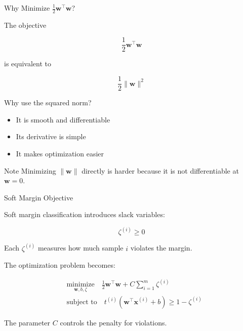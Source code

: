 \documentclass[aspectratio=169]{beamer}
\begin{document}

\begin{frame}{Why Minimize \(\frac{1}{2}\mathbf{w}^{\top}\mathbf{w}\)?}

The objective

\[
\frac{1}{2}\mathbf{w}^{\top}\mathbf{w}
\]

is equivalent to

\[
\frac{1}{2}\lVert \mathbf{w}\rVert^2
\]

\vspace{0.5em}

Why use the squared norm?

\begin{itemize}
\item It is smooth and differentiable
\item Its derivative is simple
\item It makes optimization easier
\end{itemize}

\vspace{0.5em}

\begin{exampleblock}{Note}
Minimizing \(\lVert \mathbf{w}\rVert\) directly is harder because it is not differentiable at \(\mathbf{w}=0\).
\end{exampleblock}

\end{frame}


\begin{frame}{Soft Margin Objective}

Soft margin classification introduces slack variables:

\[
\zeta^{(i)} \ge 0
\]

\vspace{0.5em}

Each \(\zeta^{(i)}\) measures how much sample \(i\) violates the margin.

\vspace{0.5em}

The optimization problem becomes:

\[
\begin{split}
& \underset{\mathbf{w}, b, \zeta}{\text{minimize}}
\quad
\frac{1}{2}\mathbf{w}^{\top}\mathbf{w}
+
C\sum_{i=1}^{m}\zeta^{(i)}
\\
& \text{subject to}
\quad
t^{(i)}
\left(
\mathbf{w}^{\top}\mathbf{x}^{(i)}+b
\right)
\ge
1-\zeta^{(i)}
\end{split}
\]

\vspace{0.5em}

The parameter \(C\) controls the penalty for violations.

\end{frame}
\end{document}

